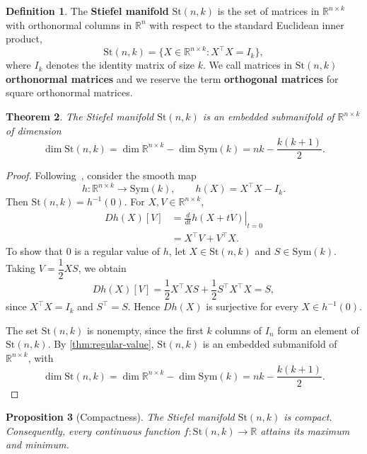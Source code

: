 \documentclass[12pt]{article}
\theoremstyle{definition}
\newtheorem{definition}{Definition}[section]
\theoremstyle{plain}
\newtheorem{proposition}[definition]{Proposition}
\newtheorem{theorem}[definition]{Theorem}
\theoremstyle{remark}
\newcommand{\R}{\mathbb{R}}
\newcommand{\St}{\mathrm{St} (n,k)}
\newcommand{\Sym}{\mathrm{Sym}}              %
\begin{document}
\begin{definition}\label{def:stiefel}
  The \textbf{Stiefel manifold} \( \St \) is the set of matrices in \( \R^{n \times k} \) with orthonormal columns in \( \R^n \) with respect to the standard Euclidean inner product,
  \[
    \St = \{ X \in \R^{n \times k} : X^\top X = I_k \},
  \]
  where \( I_k \) denotes the identity matrix of size \( k \).
  We call matrices in \( \St \) \textbf{orthonormal matrices} and we reserve the term \textbf{orthogonal matrices} for square orthonormal matrices.
\end{definition}

\begin{theorem}\label{thm:stiefel-manifold}
  The Stiefel manifold \( \St \) is an embedded submanifold of \( \R^{n \times k} \) of dimension
  \[
    \dim{\St} = \dim{\R^{n \times k}} - \dim{\Sym(k)} = nk - \frac{k(k+1)}{2}.
  \]
\end{theorem}

\begin{proof}
  Following~\cite[Section 7.3]{boumal}, consider the smooth map
  \[
    h : \R^{n \times k} \longrightarrow \Sym(k), \qquad h(X) = X^\top X - I_k.
  \]
  Then \( \St = h^{-1}(0) \).
  For \( X,V \in \R^{n \times k} \),
  \[
    \begin{aligned}
      Dh(X)[V]
      &= \left.\frac{d}{dt}h(X+tV)\right|_{t=0} \\
      &= X^\top V + V^\top X.
    \end{aligned}
  \]
  To show that \( 0 \) is a regular value of \( h \), let \( X \in \St \) and \( S \in \Sym(k) \).
  Taking \( V = \dfrac{1}{2} X S \), we obtain
  \[
    Dh(X)[V] = \frac{1}{2}X^\top XS + \frac{1}{2}S^\top X^\top X = S,
  \]
  since \( X^\top X = I_k \) and \( S^\top = S \).
  Hence \( Dh(X) \) is surjective for every \( X \in h^{-1}(0) \).

  The set \( \St \) is nonempty, since the first \( k \) columns of \( I_n \) form an element of \( \St \).
  By \cref{thm:regular-value}, \( \St \) is an embedded submanifold of \( \R^{n \times k} \), with
  \[
    \dim \St = \dim \R^{n \times k} - \dim \Sym(k) = nk - \frac{k(k+1)}{2}.
  \]
\end{proof}

\begin{proposition}[Compactness]\label{prop:stiefel-compact}
  The Stiefel manifold \( \St \) is compact. Consequently, every continuous function \( f : \St \longrightarrow \R \) attains its maximum and minimum.
\end{proposition}
\end{document}
